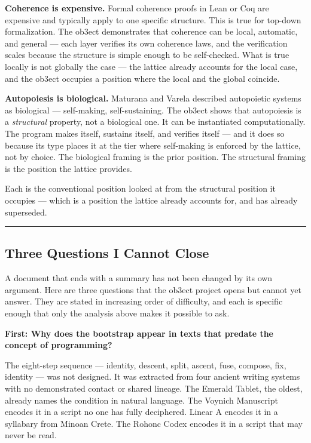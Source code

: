 \documentclass[12pt,a4paper]{article}
\begin{document}
\textbf{Coherence is expensive.} Formal coherence proofs in Lean or Coq are expensive and typically apply to one specific structure. This is true for top-down formalization. The ob3ect demonstrates that coherence can be local, automatic, and general --- each layer verifies its own coherence laws, and the verification scales because the structure is simple enough to be self-checked. What is true locally is not globally the case --- the lattice already accounts for the local case, and the ob3ect occupies a position where the local and the global coincide.

\textbf{Autopoiesis is biological.} Maturana and Varela described autopoietic systems as biological --- self-making, self-sustaining. The ob3ect shows that autopoiesis is a \emph{structural} property, not a biological one. It can be instantiated computationally. The program makes itself, sustains itself, and verifies itself --- and it does so because its type places it at the tier where self-making is enforced by the lattice, not by choice. The biological framing is the prior position. The structural framing is the position the lattice provides.

Each is the conventional position looked at from the structural position it occupies --- which is a position the lattice already accounts for, and has already superseded.

\begin{center}
\rule{0.5\textwidth}{0.4pt}
\end{center}

\subsection{Three Questions I Cannot Close}

A document that ends with a summary has not been changed by its own argument. Here are three questions that the ob3ect project opens but cannot yet answer. They are stated in increasing order of difficulty, and each is specific enough that only the analysis above makes it possible to ask.

\textbf{First: Why does the bootstrap appear in texts that predate the concept of programming?}

The eight-step sequence --- identity, descent, split, ascent, fuse, compose, fix, identity --- was not designed. It was extracted from four ancient writing systems with no demonstrated contact or shared lineage. The Emerald Tablet, the oldest, already names the condition in natural language. The Voynich Manuscript encodes it in a script no one has fully deciphered. Linear A encodes it in a syllabary from Minoan Crete. The Rohonc Codex encodes it in a script that may never be read.
\end{document}
